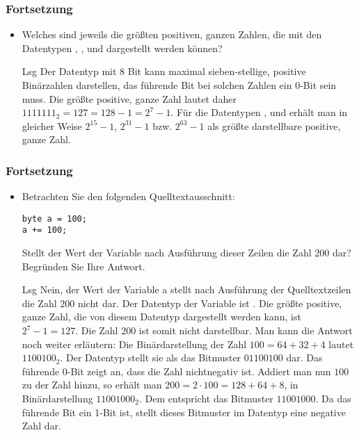 \begin{frame}[fragile]%
  \frametitle{Fortsetzung}%
\centering
\medskip

\begin{itemize}
\item
Welches sind jeweils die größten positiven, ganzen Zahlen, die mit den Datentypen , ,  und  dargestellt werden können?
\item[Lsg]
Der Datentyp  mit 8 Bit kann maximal sieben-stellige, positive Binärzahlen darstellen, das führende Bit bei solchen Zahlen ein 0-Bit sein muss.
Die größte positive, ganze Zahl lautet daher $1111111_2 = 127 = 128 - 1 = 2^7 - 1$.
Für die Datentypen ,  und  erhält man in gleicher Weise $2^{15} - 1$, $2^{31} - 1$ bzw. $2^{63} - 1$ als größte darstellbare positive, ganze Zahl.
\end{itemize}

\end{frame}

\begin{frame}[fragile]%
  \frametitle{Fortsetzung}%
\centering
\medskip

\begin{itemize}
\item
Betrachten Sie den folgenden Quelltextausschnitt:
\begin{verbatim}
byte a = 100;
a += 100;
\end{verbatim}
Stellt der Wert der Variable  nach Ausführung dieser Zeilen die Zahl $200$ dar?
Begründen Sie Ihre Antwort.

\item[Lsg]
Nein, der Wert der Variable a stellt nach Ausführung der Quelltextzeilen die Zahl $200$ nicht dar.
Der Datentyp der Variable ist .
Die größte positive, ganze Zahl, die von diesem Datentyp dargestellt werden kann, ist $2^7 - 1 = 127$. Die Zahl $200$ ist somit nicht darstellbar.
Man kann die Antwort noch weiter erläutern: Die Binärdarstellung der Zahl $100 = 64 + 32 + 4$ lautet $1100100_2$.
Der Datentyp  stellt sie als das Bitmuster $01100100$ dar.
Das führende 0-Bit zeigt an, dass die Zahl nichtnegativ ist.
Addiert man nun $100$ zu der Zahl hinzu, so erhält man $200 = 2 \cdot 100 = 128 + 64 + 8$, in Binärdarstellung $11001000_2$.
Dem entspricht das Bitmuster $11001000$.
Da das führende Bit ein 1-Bit ist, stellt dieses Bitmuster im Datentyp  eine negative Zahl dar.
\end{itemize}
\end{frame}